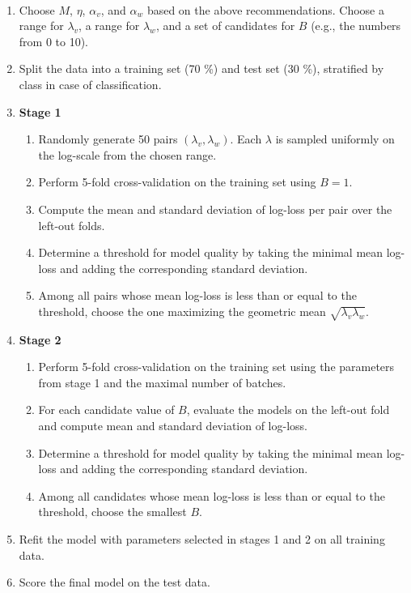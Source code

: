 \begin{algorithm}~
\label{alg_hyperparameters}
\begin{enumerate}
\item Choose $M$, $\eta$, $\alpha_v$, and $\alpha_w$ based on the above recommendations.
Choose a range for $\lambda_v$, a range for $\lambda_w$, and a set of candidates for $B$ (e.g., the numbers from 0 to 10).
%
\item Split the data into a training set (70 \%) and test set (30 \%), stratified by class in case of classification.
%
\item\textbf{Stage 1}
%
\begin{enumerate}
\item Randomly generate 50 pairs $(\lambda_v,\lambda_w)$.
Each $\lambda$ is sampled uniformly on the log-scale from the chosen range.
%
\item Perform 5-fold cross-validation on the training set using $B=1$.
%
\item Compute the mean and standard deviation of log-loss per pair over the left-out folds.
%
\item Determine a threshold for model quality by taking the minimal mean log-loss and adding the corresponding standard deviation.
%
\item Among all pairs whose mean log-loss is less than or equal to the threshold, choose the one maximizing the geometric mean $\sqrt{\lambda_v\lambda_w}$.
\end{enumerate}
%
\item\textbf{Stage 2}
\begin{enumerate}
\item Perform 5-fold cross-validation on the training set using the parameters from stage 1 and the maximal number of batches.
%
\item For each candidate value of $B$, evaluate the models on the left-out fold and compute mean and standard deviation of log-loss.
%
\item Determine a threshold for model quality by taking the minimal mean log-loss and adding the corresponding standard deviation.
%
\item Among all candidates whose mean log-loss is less than or equal to the threshold, choose the smallest $B$.
\end{enumerate}
%
\item Refit the model with parameters selected in stages 1 and 2 on all training data.
%
\item Score the final model on the test data.
\end{enumerate}
\end{algorithm}
